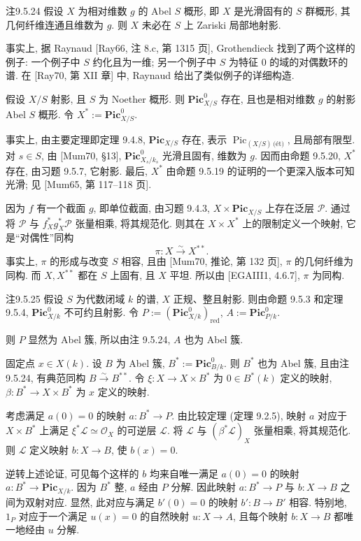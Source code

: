 \begin{origstatement}{注}{9.5.24}\label{ch09s05:rem9.5.24}
假设 $X$ 为相对维数 $g$ 的 Abel $S$ 概形, 即 $X$ 是光滑固有的 $S$ 群概形, 其几何纤维连通且维数为 $g$. 则 $X$ 未必在 $S$ 上 Zariski 局部地射影.

事实上, 据 Raynaud [Ray66, 注 8.c, 第 1315 页], Grothendieck 找到了两个这样的例子: 一个例子中 $S$ 约化且为一维; 另一个例子中 $S$ 为特征 $0$ 的域的对偶数环的谱. 在 [Ray70, 第 XII 章] 中, Raynaud 给出了类似例子的详细构造.

假设 $X/S$ 射影, 且 $S$ 为 Noether 概形. 则 $\mathbf{Pic}^0_{X/S}$ 存在, 且也是相对维数 $g$ 的射影 Abel $S$ 概形. 令 $X^*:=\mathbf{Pic}^0_{X/S}$.

事实上, 由主要定理即定理 9.4.8, $\mathbf{Pic}_{X/S}$ 存在, 表示 $\operatorname{Pic}_{(X/S)\,\text{(\'{e}t)}}$, 且局部有限型. 对 $s\in S$, 由 [Mum70, \S13], $\mathbf{Pic}^0_{X_s/k_s}$ 光滑且固有, 维数为 $g$. 因而由命题 9.5.20, $X^*$ 存在, 由习题 9.5.7, 它射影. 最后, $X^*$ 由命题 9.5.19 的证明的一个更深入版本可知光滑; 见 [Mum65, 第 117--118 页].

因为 $f$ 有一个截面 $g$, 即单位截面, 由习题 9.4.3, $X\times\mathbf{Pic}_{X/S}$ 上存在泛层 $\mathcal P$. 通过将 $\mathcal P$ 与 $f_X^*g_X^*\mathcal P$ 张量相乘, 将其规范化. 则其在 $X\times X^*$ 上的限制定义一个映射, 它是“对偶性”同构
\[
 \pi:X\xrightarrow{\sim}X^{**}.
\]
事实上, $\pi$ 的形成与改变 $S$ 相容, 且由 [Mum70, 推论, 第 132 页], $\pi$ 的几何纤维为同构. 而 $X,X^{**}$ 都在 $S$ 上固有, 且 $X$ 平坦. 所以由 [EGAIII1, 4.6.7], $\pi$ 为同构.
\end{origstatement}

\begin{origstatement}{注}{9.5.25}\label{ch09s05:rem9.5.25}
假设 $S$ 为代数闭域 $k$ 的谱, $X$ 正规、整且射影. 则由命题 9.5.3 和定理 9.5.4, $\mathbf{Pic}^0_{X/k}$ 不可约且射影. 令 $P:=(\mathbf{Pic}^0_{X/k})_{\mathrm{red}}$, $A:=\mathbf{Pic}^0_{P/k}$.


则 $P$ 显然为 Abel 簇, 所以由注 9.5.24, $A$ 也为 Abel 簇.

固定点 $x\in X(k)$. 设 $B$ 为 Abel 簇, $B^*:=\mathbf{Pic}^0_{B/k}$. 则 $B^*$ 也为 Abel 簇, 且由注 9.5.24, 有典范同构 $B\xrightarrow{\sim}B^{**}$. 令 $\xi:X\to X\times B^*$ 为 $0\in B^*(k)$ 定义的映射, $\beta:B^*\to X\times B^*$ 为 $x$ 定义的映射.

考虑满足 $a(0)=0$ 的映射 $a:B^*\to P$. 由比较定理 (定理 9.2.5), 映射 $a$ 对应于 $X\times B^*$ 上满足 $\xi^*\mathcal L\simeq\mathcal O_X$ 的可逆层 $\mathcal L$. 将 $\mathcal L$ 与 $(\beta^*\mathcal L)_X$ 张量相乘, 将其规范化. 则 $\mathcal L$ 定义映射 $b:X\to B$, 使 $b(x)=0$.

逆转上述论证, 可见每个这样的 $b$ 均来自唯一满足 $a(0)=0$ 的映射 $a:B^*\to\mathbf{Pic}_{X/k}$. 因为 $B^*$ 整, $a$ 经由 $P$ 分解. 因此映射 $a:B^*\to P$ 与 $b:X\to B$ 之间为双射对应. 显然, 此对应与满足 $b'(0)=0$ 的映射 $b':B\to B'$ 相容. 特别地, $1_P$ 对应于一个满足 $u(x)=0$ 的自然映射 $u:X\to A$, 且每个映射 $b:X\to B$ 都唯一地经由 $u$ 分解.
\end{origstatement}


